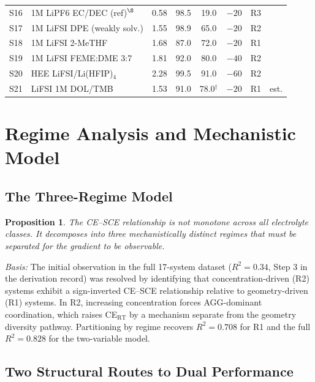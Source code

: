 \documentclass[11pt]{article}
\theoremstyle{plain}
\newtheorem{proposition}[theorem]{Proposition}
\theoremstyle{definition}
\theoremstyle{remark}
\begin{document}
\begin{table}[h!]
\begin{tabular}{llcccccl}
S16 & 1M LiPF6 EC/DEC (ref)$^\S$ & 0.58 & 98.5 & 19.0 & $-20$ & R3 & \cite{Zhang2020} \\
S17 & 1M LiFSI DPE (weakly solv.) & 1.55 & 98.9 & 65.0 & $-20$ & R2 & \cite{Yu2022} \\
S18 & 1M LiFSI 2-MeTHF & 1.68 & 87.0 & 72.0 & $-20$ & R1 & \cite{Guo2023} \\
S19 & 1M LiFSI FEME:DME 3:7 & 1.81 & 92.0 & 80.0 & $-40$ & R2 & \cite{Liu2024} \\
S20 & HEE LiFSI/Li(HFIP)$_4$ & 2.28 & 99.5 & 91.0 & $-60$ & R2 & \cite{Ding2025} \\
S21 & LiFSI 1M DOL/TMB & 1.53 & 91.0 & 78.0$^\dagger$ & $-20$ & R1 & est. \\
\bottomrule
\end{tabular}
\end{table}

\section{Regime Analysis and Mechanistic Model}

\subsection{The Three-Regime Model}

\begin{proposition}
The CE--SCE relationship is not monotone across all electrolyte classes.
It decomposes into three mechanistically distinct regimes that must be
separated for the gradient to be observable.
\end{proposition}

\noindent\textit{Basis:} The initial observation in the full 17-system dataset
($R^2 = 0.34$, Step 3 in the derivation record) was resolved by identifying
that concentration-driven (R2) systems exhibit a sign-inverted CE--SCE
relationship relative to geometry-driven (R1) systems.  In R2, increasing
concentration forces AGG-dominant coordination, which raises CE$_{\mathrm{RT}}$
by a mechanism separate from the geometry diversity pathway.  Partitioning
by regime recovers $R^2 = 0.708$ for R1 and the full $R^2 = 0.828$ for the
two-variable model.

\subsection{Two Structural Routes to Dual Performance}
\end{document}
